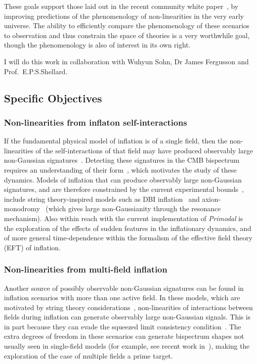 These goals support those laid out in the recent community white paper~\cite{astro2020_png},
by improving predictions of the phenomenology of non-linearities in the very early universe.
The ability to efficiently compare the phenomenology of these scenarios to observation and thus constrain the space of theories is a very worthwhile goal, though the phenomenology is also of interest in its own right.

I will do this work in collaboration with Wuhyun Sohn, Dr James Fergusson and Prof.~E.P.S.Shellard.

\subsection*{Specific Objectives}
\subsubsection*{Non-linearities from inflaton self-interactions}
If the fundamental physical model of inflation is of a single field,
then the non-linearities of the self-interactions of that field may have
produced observably large non-Gaussian signatures~\cite{Tolley_2010, achucarro_eft}.
Detecting these signatures in the CMB bispectrum requires an understanding
of their form~\cite{Komatsu_2005}, which motivates the study of these dynamics.
Models of inflation that can produce observably large non-Gaussian signatures,
and are therefore constrained by the current experimental bounds~\cite{Planck_NG_2018},
include string theory-inspired models such as DBI inflation~\cite{dbi_silverstein}
and axion-monodromy~\cite{axion_monodr_review_09, Flauger_2014}
(which gives large non-Gaussianity through the resonance mechanism).
Also within reach with the current implementation of \textit{Primodal}
is the exploration of the effects of sudden
features in the inflationary dynamics, and of more general
time-dependence within the formalism of the effective field theory (EFT) of inflation. 

\subsubsection*{Non-linearities from multi-field inflation}
Another source of possibly observable non-Gaussian signatures can be
found in inflation scenarios with more than one active field.
In these models, which are motivated by string theory considerations~\cite{achucarro_multifield1},
non-linearities of interactions between fields during inflation
can generate observably large non-Gaussian signals.
This is in part because they can evade the squeezed limit consistency condition~\cite{sqz_consistency}.
The extra degrees of freedom in these scenarios can generate bispectrum shapes not usually
seen in single-field models (for example, see recent work in~\cite{RP_2, Fumagalli_2019}),
making the exploration of the case of multiple fields a prime target.

